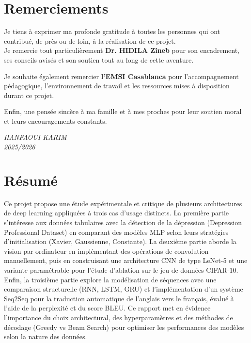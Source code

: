 \documentclass[a4paper,11pt,oneside]{report}
\begin{document}
\chapter*{Remerciements}
\thispagestyle{empty}

\vspace{1cm}

Je tiens à exprimer ma profonde gratitude à toutes les personnes qui ont contribué, de près ou de loin, à la réalisation de ce projet. \\[0.5cm]

Je remercie tout particulièrement \textbf{Dr. HIDILA Zineb} pour son encadrement, ses conseils avisés et son soutien tout au long de cette aventure.

Je souhaite également remercier \textbf{l'EMSI Casablanca} pour l'accompagnement pédagogique, l'environnement de travail et les ressources mises à disposition durant ce projet.

Enfin, une pensée sincère à ma famille et à mes proches pour leur soutien moral et leurs encouragements constants.

\vfill

\begin{flushright}
    \textit{HANFAOUI KARIM}\\
    \textit{2025/2026}
\end{flushright}

\clearpage
\chapter*{Résumé}
Ce projet propose une étude expérimentale et critique de plusieurs architectures de deep learning appliquées à trois cas d'usage distincts. La première partie s'intéresse aux données tabulaires avec la détection de la dépression (Depression Professional Dataset) en comparant des modèles MLP selon leurs stratégies d'initialisation (Xavier, Gaussienne, Constante). La deuxième partie aborde la vision par ordinateur en implémentant des opérations de convolution manuellement, puis en construisant une architecture CNN de type LeNet-5 et une variante paramétrable pour l'étude d'ablation sur le jeu de données CIFAR-10. Enfin, la troisième partie explore la modélisation de séquences avec une comparaison structurelle (RNN, LSTM, GRU) et l'implémentation d'un système Seq2Seq pour la traduction automatique de l'anglais vers le français, évalué à l'aide de la perplexité et du score BLEU. Ce rapport met en évidence l'importance du choix architectural, des hyperparamètres et des méthodes de décodage (Greedy vs Beam Search) pour optimiser les performances des modèles selon la nature des données.
\end{document}
